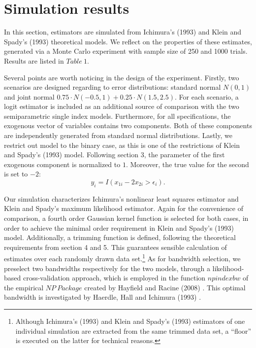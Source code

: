 \documentclass[a4paper]{article}
\begin{document}


\section{Simulation results} %
\label{sec:Simulation results}


In this section, estimators are simulated from Ichimura's (1993) \cite{[6]} and Klein and Spady's (1993) \cite{[12]} theoretical models. We reflect on the properties of these estimates, generated via a Monte Carlo experiment with sample size of 250 and 1000 trials. Results are listed in $Table\ 1$.

Several points are worth noticing in the design of the experiment. Firstly, two scenarios are designed regarding to error distributions: standard normal $N(0,1)$ and joint normal $0.75 \cdot N(-0.5,1)+0.25\cdot N(1.5,2.5)$. For each scenario, a logit estimator is included as an additional source of comparison with the two semiparametric single index models. Furthermore, for all specifications, the exogenous vector of variables contains two components. Both of these components are independently generated from standard normal distributions. Lastly, we restrict out model to the binary case, as this is one of the restrictions of Klein and Spady's (1993) \cite{[12]} model. Following section 3, the parameter of the first exogenous component is normalized to $1$. Moreover, the true value for the second is set to $-2$:
\begin{equation*}
y_i = I(x_{1i} - 2x_{2i} > \epsilon_i).
\end{equation*}

Our simulation characterizes Ichimura's \cite{[6]} nonlinear least squares estimator and Klein and Spady's \cite{[12]} maximum likelihood estimator. Again for the convenience of comparison, a fourth order Gaussian kernel function is selected for both cases, in order to achieve the minimal order requirement in Klein and Spady's (1993) \cite{[12]} model. Additionally, a trimming function is defined, following the theoretical requirements from section 4 and 5. This guarantees sensible calculation of estimates over each randomly drawn data set.\footnote{Although Ichimura's (1993) \cite{[6]} and Klein and Spady's (1993) \cite{[12]} estimators of one individual simulation are extracted from the same trimmed data set, a ``floor'' is executed on the latter for technical reasons.} As for bandwidth selection, we preselect two bandwidths respectively for the two models, through a likelihood-based cross-validation approach, which is employed in the function $npindexbw$ of the empirical $NP\ Package$ created by Hayfield and Racine (2008) \cite{[28]}. This optimal bandwidth is investigated by Haerdle, Hall and Ichimura (1993) \cite{[18]} .
\end{document}
